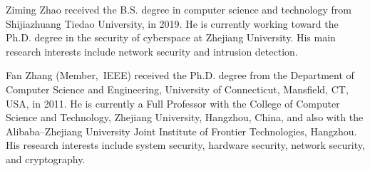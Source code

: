\begin{IEEEbiography}
{Ziming Zhao} received the B.S. degree in computer science and technology from Shijiazhuang Tiedao University, in 2019.
He is currently working toward the Ph.D. degree in the security of cyberspace at Zhejiang University. 
His main research interests include network security and intrusion detection.
\end{IEEEbiography}

\begin{IEEEbiography}
{Fan Zhang} (Member,~IEEE) received the Ph.D. degree from the Department of Computer Science and Engineering, University of Connecticut, Mansfield, CT, USA, in 2011.
He is currently a Full Professor with the College of Computer Science and Technology, Zhejiang University, Hangzhou, China, and also with the Alibaba–Zhejiang University Joint Institute of Frontier Technologies, Hangzhou. 
His research interests include system security, hardware security, network security, and cryptography.
\end{IEEEbiography}

